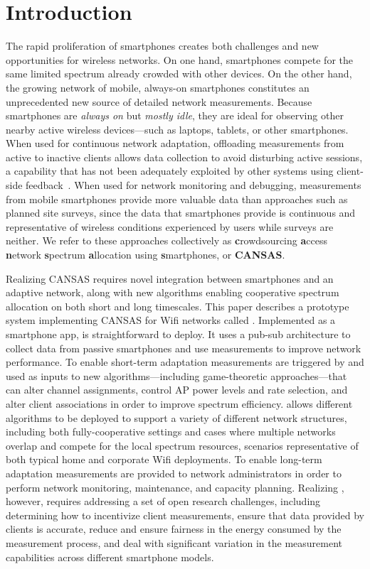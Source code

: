 \section{Introduction}

The rapid proliferation of smartphones creates both challenges and new
opportunities for wireless networks. On one hand, smartphones compete for the
same limited spectrum already crowded with other devices. On the other hand,
the growing network of mobile, always-on smartphones constitutes an
unprecedented new source of detailed network measurements. Because
smartphones are \textit{always on} but \textit{mostly idle}, they are ideal
for observing other nearby active wireless devices---such as laptops,
tablets, or other smartphones. When used for continuous network adaptation,
offloading measurements from active to inactive clients allows data
collection to avoid disturbing active sessions, a capability that has not
been adequately exploited by other systems using client-side
feedback~\cite{vasan:infocom2005,mishra:mccr2005,dasilva:mswim2008,mishra:infocom2006,mishra:sigmetrics2006,mishra:mobicom2006,murty:hotnets2008,rayanchu:mobicom2011}.
When used for network monitoring and debugging, measurements from mobile
smartphones provide more valuable data than approaches such as planned site
surveys, since the data that smartphones provide is continuous and
representative of wireless conditions experienced by users while surveys are
neither. We refer to these approaches collectively as \textbf{c}rowdsourcing
\textbf{a}ccess \textbf{n}etwork \textbf{s}pectrum \textbf{a}llocation using
\textbf{s}martphones, or \textbf{CANSAS}.

Realizing CANSAS requires novel integration between smartphones and an
adaptive network, along with new algorithms enabling cooperative spectrum
allocation on both short and long timescales. This paper describes a
prototype system implementing CANSAS for Wifi networks called \PS{}.
Implemented as a smartphone app, \PS{} is straightforward to deploy. It uses
a pub-sub architecture to collect data from passive smartphones and use
measurements to improve network performance. To enable short-term adaptation
measurements are triggered by and used as inputs to new
algorithms---including game-theoretic approaches---that can alter channel
assignments, control AP power levels and rate selection, and alter client
associations in order to improve spectrum efficiency. \PS{} allows different
algorithms to be deployed to support a variety of different network
structures, including both fully-cooperative settings and cases where
multiple networks overlap and compete for the local spectrum resources,
scenarios representative of both typical home and corporate Wifi deployments.
To enable long-term adaptation measurements are provided to network
administrators in order to perform network monitoring, maintenance, and
capacity planning. Realizing \PS{}, however, requires addressing a set of
open research challenges, including determining how to incentivize client
measurements, ensure that data provided by clients is accurate, reduce and
ensure fairness in the energy consumed by the measurement process, and deal
with significant variation in the measurement capabilities across different
smartphone models.

